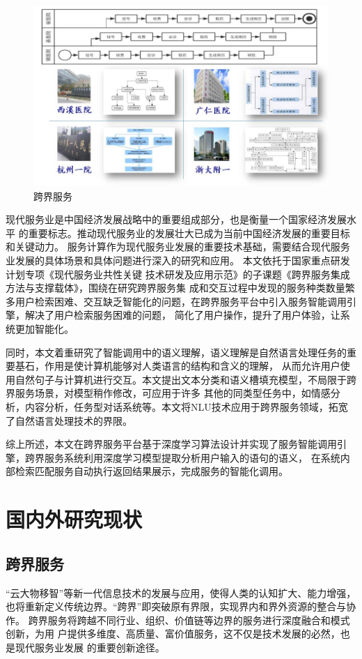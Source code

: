 \begin{figure}[htbp]
  \centering
  \includegraphics[scale=1]{./images/hospitalRunningModel.jpg}
  \caption{跨界服务}
  \label{fig:kuajiefuwu}
\end{figure}


现代服务业是中国经济发展战略中的重要组成部分，也是衡量一个国家经济发展水平
的重要标志。推动现代服务业的发展壮大已成为当前中国经济发展的重要目标和关键动力。
服务计算作为现代服务业发展的重要技术基础，需要结合现代服务业发展的具体场景和具体问题进行深入的研究和应用。
本文依托于国家重点研发计划专项《现代服务业共性关键
技术研发及应用示范》的子课题《跨界服务集成方法与支撑载体》，围绕在研究跨界服务集
成和交互过程中发现的服务种类数量繁多用户检索困难、交互缺乏智能化的问题，在跨界服务平台中引入服务智能调用引擎，解决了用户检索服务困难的问题，
简化了用户操作，提升了用户体验，让系统更加智能化。

同时，本文着重研究了智能调用中的语义理解，语义理解是自然语言处理任务的重要基石，作用是使计算机能够对人类语言的结构和含义的理解，
从而允许用户使用自然句子与计算机进行交互。本文提出文本分类和语义槽填充模型，不局限于跨界服务场景，对模型稍作修改，可应用于许多
其他的同类型任务中，如情感分析，内容分析，任务型对话系统等。本文将NLU技术应用于跨界服务领域，拓宽了自然语言处理技术的界限。

综上所述，本文在跨界服务平台基于深度学习算法设计并实现了服务智能调用引擎，跨界服务系统利用深度学习模型提取分析用户输入的语句的语义，
在系统内部检索匹配服务自动执行返回结果展示，完成服务的智能化调用。

\section{国内外研究现状}
\subsection{跨界服务}
“云大物移智”等新一代信息技术的发展与应用，使得人类的认知扩大、能力增强，
也将重新定义传统边界。“跨界”即突破原有界限，实现界内和界外资源的整合与协作。
跨界服务将跨越不同行业、组织、价值链等边界的服务进行深度融合和模式创新，为用
户提供多维度、高质量、富价值服务，这不仅是技术发展的必然，也是现代服务业发展
的重要创新途径。

